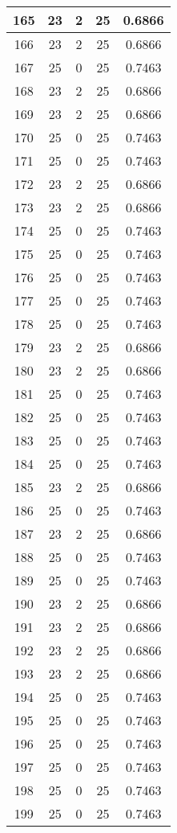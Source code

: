 \documentclass[letterpaper, 12pt]{article}
\begin{document}
\begin{longtable}{|c|c|c|c|c|}
\hline
165 & 23 & 2 & 25 & 0.6866 \\
\hline
166 & 23 & 2 & 25 & 0.6866 \\
\hline
167 & 25 & 0 & 25 & 0.7463 \\
\hline
168 & 23 & 2 & 25 & 0.6866 \\
\hline
169 & 23 & 2 & 25 & 0.6866 \\
\hline
170 & 25 & 0 & 25 & 0.7463 \\
\hline
171 & 25 & 0 & 25 & 0.7463 \\
\hline
172 & 23 & 2 & 25 & 0.6866 \\
\hline
173 & 23 & 2 & 25 & 0.6866 \\
\hline
174 & 25 & 0 & 25 & 0.7463 \\
\hline
175 & 25 & 0 & 25 & 0.7463 \\
\hline
176 & 25 & 0 & 25 & 0.7463 \\
\hline
177 & 25 & 0 & 25 & 0.7463 \\
\hline
178 & 25 & 0 & 25 & 0.7463 \\
\hline
179 & 23 & 2 & 25 & 0.6866 \\
\hline
180 & 23 & 2 & 25 & 0.6866 \\
\hline
181 & 25 & 0 & 25 & 0.7463 \\
\hline
182 & 25 & 0 & 25 & 0.7463 \\
\hline
183 & 25 & 0 & 25 & 0.7463 \\
\hline
184 & 25 & 0 & 25 & 0.7463 \\
\hline
185 & 23 & 2 & 25 & 0.6866 \\
\hline
186 & 25 & 0 & 25 & 0.7463 \\
\hline
187 & 23 & 2 & 25 & 0.6866 \\
\hline
188 & 25 & 0 & 25 & 0.7463 \\
\hline
189 & 25 & 0 & 25 & 0.7463 \\
\hline
190 & 23 & 2 & 25 & 0.6866 \\
\hline
191 & 23 & 2 & 25 & 0.6866 \\
\hline
192 & 23 & 2 & 25 & 0.6866 \\
\hline
193 & 23 & 2 & 25 & 0.6866 \\
\hline
194 & 25 & 0 & 25 & 0.7463 \\
\hline
195 & 25 & 0 & 25 & 0.7463 \\
\hline
196 & 25 & 0 & 25 & 0.7463 \\
\hline
197 & 25 & 0 & 25 & 0.7463 \\
\hline
198 & 25 & 0 & 25 & 0.7463 \\
\hline
199 & 25 & 0 & 25 & 0.7463 \\
\hline
\end{longtable}
\end{document}
